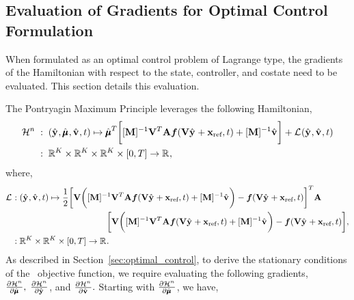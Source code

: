 \documentclass[3p,computermodern,10pt]{elsarticle}
\begin{document}
\begin{appendices}
\section{Evaluation of Gradients for Optimal Control Formulation}\label{appendix:optimal_control}
When formulated as an optimal control problem of Lagrange type, the gradients of the Hamiltonian with respect to the state, controller, and costate 
need to be evaluated. This section details this evaluation.

The Pontryagin Maximum Principle leverages the following Hamiltonian,
\begin{align*}
\hamiltonian^n \; &: \;  (\genstateyDiscreteArgnt{},\adjointDiscreteDumArgnt{},\controllerDiscreteDumArgnt{},t) \mapsto 
 \adjointDiscreteDumArgnt{T} \bigg[  [\massArgnt{n}]^{-1}\basisspace^T \stweightingMatArg{n}\velocity(\veloargsromy) + [\massArgnt{n}]^{-1}\controllerDiscreteDumArgnt{} \bigg] +  \objectiveControlArg{}(\genstateyDiscreteArgnt{},\controllerDiscreteDumArgnt{},t) \\
&: \; \RR{\romdim} \times \RR{\romdim} \times \RR{\romdim} \times [0,T] \rightarrow \RR{},
\end{align*} 
where,
\begin{align*}
 \objectiveControlArg{} &:  (\genstateyDiscreteArgnt{},\controllerDiscreteDumArgnt{},t)
\mapsto \frac{1}{2} \bigg[ \basisspace \bigg(  [\massArgnt{n}]^{-1}\basisspace^T
\stweightingMatArg{n}  \velocity(\veloargsromy) + [\massArgnt{n}]^{-1}\controllerDiscreteDumArgnt{} \bigg) -
\velocity(\veloargsromy) \bigg]^T
\stweightingMatArg{n}  \\ & \hspace{1.5 in}\bigg[ \basisspace \bigg(
[\massArgnt{n}]^{-1}\basisspace^T \stweightingMatArg{n}\velocity(\veloargsromy) + [\massArgnt{n}]^{-1}\controllerDiscreteDumArgnt{}
\bigg) - \velocity( \veloargsromy ) \bigg]
, \nonumber \\ & : \RR{\romdim} \times \RR{\romdim} \times [0,T] \rightarrow \RR{}.
\end{align*} 
As described in Section~\ref{sec:optimal_control}, to derive the stationary conditions of the \methodAcronym\ objective function, we require evaluating the following gradients,
$ \frac{\partial \hamiltonianArg{n}}{\partial \adjointDiscreteDumArgnt{}{}}, \;   \frac{\partial \hamiltonianArg{n}}{\partial \genstateyDiscreteArgnt{}{}}$, and $\frac{\partial \hamiltonianArg{n}}{\partial \controllerDiscreteDumArgnt{}{}}.$  Starting with $\frac{\partial \hamiltonianArg{n}}{\partial \adjointDiscreteDumArgnt{}{}}$, we have,
$$
$$
\end{appendices}
\end{document}
